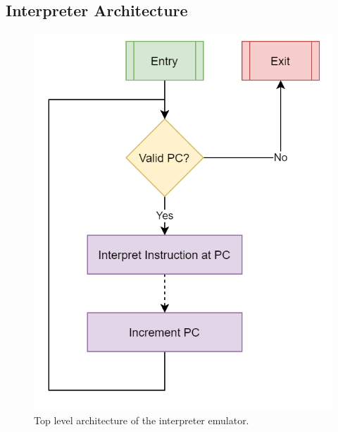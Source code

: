 \subsection{Interpreter Architecture}




\begin{figure}[h]
    \centering
    \includegraphics[width=0.5\linewidth]{diagrams/interpreter.png}
    \caption{Top level architecture of the interpreter emulator.}
    \label{figure:interpreter-arch}
\end{figure}